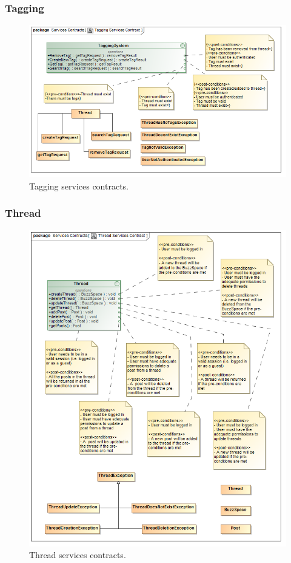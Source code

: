 \documentclass [a4paper,12pt] {article}
\begin{document}
		\subsubsection{Tagging}
			\begin{figure}[H]
				\centering
				\includegraphics[width=1.0\textwidth]{TaggingSC.png}
				\caption{Tagging services contracts.}
			\end{figure}
		\subsubsection{Thread}
			\begin{figure}[H]
				\centering
				\includegraphics[width=1.0\textwidth]{ThreadSC.png}
				\caption{Thread services contracts.}
			\end{figure}	
\end{document}
